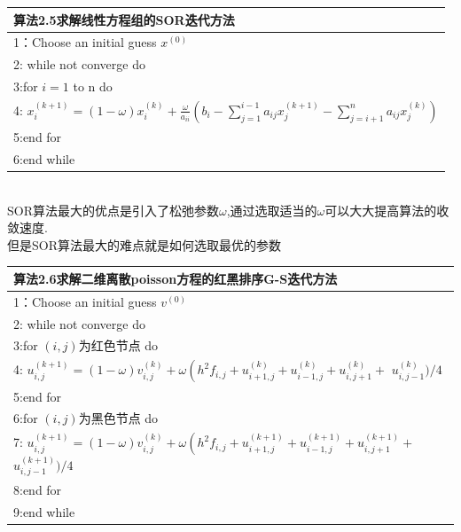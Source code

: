 \documentclass[notheorems,serif]{beamer}
\begin{document}
\begin{frame}
\begin{tabular}{l}
\hline
{\color{blue}算法2.5}求解线性方程组的SOR迭代方法\\
\hline
1：Choose an initial guess $x^{(0)}$\\
2: while not converge do\\
3:\qquad for $i=1$ to n do\\
4:\qquad \qquad
$x_{i}^{(k+1)}=(1-\omega) x_{i}^{(k)}+\frac{\omega}{a_{i i}}\left(b_{i}-\sum_{j=1}^{i-1} a_{i j} x_{j}^{(k+1)}-\sum_{j=i+1}^{n} a_{i j} x_{j}^{(k)}\right)$\\
5:\qquad end for\\
6:end while\\
\hline
\end{tabular}\\
SOR算法最大的优点是引入了松弛参数$\omega$,通过选取适当的$\omega$可以大大提高算法的收敛速度.\\
但是SOR算法最大的难点就是如何选取最优的参数\\
\end{frame}

\begin{frame}
\begin{tabular}{l}
\hline
{\color{blue}算法2.6}求解二维离散poisson方程的红黑排序G-S迭代方法\\
\hline
1：Choose an initial guess $v^{(0)}$\\
2: while not converge do\\
3:\qquad for $(i,j)$为红色节点 do\\
4:\qquad \qquad
$u_{i, j}^{(k+1)}=(1-\omega) v_{i, j}^{(k)}+\omega\left(h^{2} f_{i, j}+u_{i+1, j}^{(k)}+u_{i-1, j}^{(k)}+u_{i, j+1}^{(k)}+\right.$
$u_{i, j-1}^{(k)} ) / 4$\\
5:\qquad end for\\
6:\qquad for $(i,j)$为黑色节点 do\\
7:\qquad \qquad
$u_{i, j}^{(k+1)}=(1-\omega) v_{i, j}^{(k)}+\omega\left(h^{2} f_{i, j}+u_{i+1, j}^{(k+1)}+u_{i-1, j}^{(k+1)}+u_{i, j+1}^{(k+1)}+\right.$
$u_{i, j-1}^{(k+1)} ) / 4$\\
8:\qquad end for\\
9:end while\\
\hline
\end{tabular}\\
\end{frame}
\end{document}
